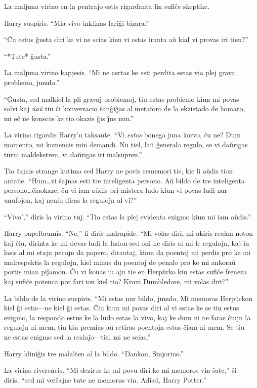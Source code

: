 La maljuna virino en la pentraĵo estis rigardanta lin sufiĉe skeptike.

Harry suspiris. ``Mia vivo inklinas fariĝi bizara.''

``Ĉu estus ĝusta diri ke vi ne scias kien vi estas iranta aŭ kial vi
provas iri tien?''

``*Tute* ĝusta.''

La maljuna virino kapjesis. ``Mi ne certas ke esti perdita estas via
plej grava problemo, junulo.''

``Ĝusta, sed malkiel la pli gravaj problemoj, tiu estas problemo kiun mi povas
solvi kaj \emph{ŭaŭ} tiu ĉi konversacio ŝanĝiĝas al metaforo de la ekzistado de
homaro, mi eĉ ne konsciis ke tio okazis ĝis ĵus nun.''

La virino rigardis Harry'n taksante. ``Vi \emph{estas} bonega juna
korvo, ĉu ne? Dum momento, mi komencis min demandi. Nu tiel, laŭ
ĝenerala regulo, se vi daŭrigas turni maldekstren, vi daŭrigas
iri malsupren.''

Tio ŝajnis strange kutima sed Harry ne povis rememori tie, kie li aŭdis tion
antaŭe. ``Hum\ldots vi ŝajnas esti tre inteligenta persono. Aŭ bildo de tre
inteligenta persono\ldots ĉiaokaze, ĉu vi iam aŭdis pri mistera ludo kiun vi povas
ludi nur unufojon, kaj neniu diras la regulojn al vi?''

``Vivo','' diris la virino tuj. ``Tio estas la plej evidenta enigmo
kiun mi iam aŭdis.''

Harry papelbrumis. ``Ne,'' li diris malrapide. ``Mi volas diri, mi akiris realan
noton kaj ĉiu, dirinta ke mi devas ludi la ludon sed oni ne diris al mi le
regulojn, kaj iu lasis al mi etajn pecojn da papero, dirantaj, kiom da poentoj
mi perdis pro ke mi malrespektis la regulojn, kiel minus du poentoj de penalo
pro ke mi ankoraŭ portis mian piĵamon. Ĉu vi konas iu ajn tie en Herpŭrko kiu
estas sufiĉe freneza kaj sufiĉe potenca por fari ion kiel tio? Krom Dumbledore,
mi volas diri?''

La bildo de la virino suspiris. ``Mi estas nur bildo, junulo. Mi memoras
Herpŭrkon kiel ĝi estis—ne kiel ĝi estas. Ĉiu kiun mi povas diri al vi estas ke
se tiu estus enigmo, la respondo estus ke la ludo estas la vivo, kaj ke dum ni
ne faras ĉiujn la regulojn ni mem, tiu kiu premias aŭ retiras poentojn estas
ĉiam ni mem. Se tiu ne estas enigmo sed la realaĵo—tial mi ne scias.''

Harry kliniĝis tre malalten al la bildo. ``Dankon, Sinjorino.''

La virino riverencis. ``Mi dezirus ke mi povu diri ke mi memoros vin ŝate,'' ŝi
diris, ``sed mi verŝajne tute ne memorus vin. Adiaŭ, Harry Potter.''

